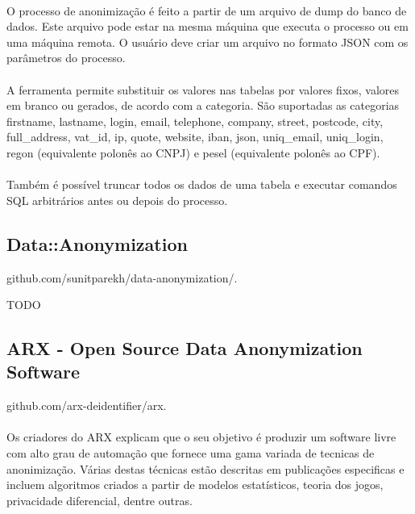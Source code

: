\paragraph{} O processo de anonimização é feito a partir de um arquivo de dump do banco de dados. Este arquivo pode estar na mesma máquina que executa o processo ou em uma máquina remota. O usuário deve criar um arquivo no formato JSON com os parâmetros do processo.

\paragraph{} A ferramenta permite substituir os valores nas tabelas por valores fixos, valores em branco ou gerados, de acordo com a categoria. São suportadas as categorias firstname, lastname, login, email, telephone, company, street, postcode, city, full{\_}address, vat{\_}id, ip, quote, website, iban, json, uniq{\_}email, uniq{\_}login, regon (equivalente polonês ao CNPJ) e pesel (equivalente polonês ao CPF). 

\paragraph{} Também é possível truncar todos os dados de uma tabela e executar comandos SQL arbitrários antes ou depois do processo.

\subsection{Data::Anonymization}

github.com/sunitparekh/data-anonymization/.

TODO

\subsection{ARX - Open Source Data Anonymization Software}

github.com/arx-deidentifier/arx.

\paragraph{} Os criadores do ARX explicam que o seu objetivo é produzir um software livre com alto grau de automação que fornece uma gama variada de tecnicas de anonimização. Várias destas técnicas estão descritas em publicações especificas e incluem algoritmos criados a partir de modelos estatísticos, teoria dos jogos, privacidade diferencial, dentre outras.

